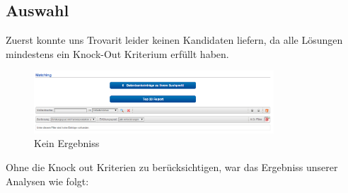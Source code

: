 \documentclass[12pt]{article}
\begin{document}
\subsection{Auswahl}
Zuerst konnte uns Trovarit leider keinen Kandidaten liefern, da alle Lösungen mindestens ein Knock-Out Kriterium erfüllt haben.
\begin{figure}[!h]
\centering
\includegraphics[width=0.8\textwidth]{images/matching1}
\caption{Kein Ergebniss}
\label{fig:matching1}
\end{figure}\FloatBarrier
\noindent
Ohne die Knock out Kriterien zu berücksichtigen, war das Ergebniss unserer Analysen wie folgt:
\end{document}
